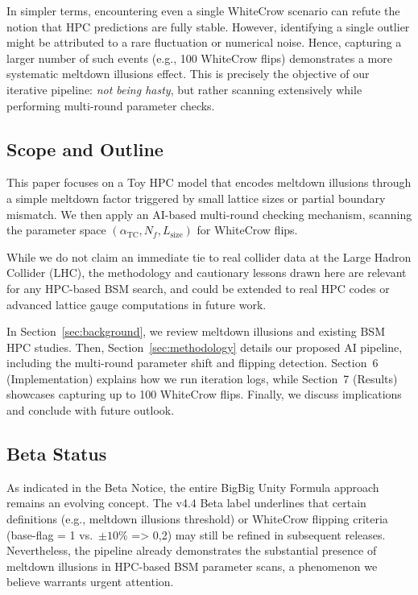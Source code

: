\documentclass[11pt]{article}
\begin{document}
In simpler terms, encountering even a single WhiteCrow scenario can refute 
the notion that HPC predictions are fully stable. However, identifying 
a single outlier might be attributed to a rare fluctuation or numerical noise. 
Hence, capturing a larger number of such events (e.g., 100 WhiteCrow flips) 
demonstrates a more systematic meltdown illusions effect. 
This is precisely the objective of our iterative pipeline: 
\textit{not being hasty}, but rather scanning extensively while performing 
multi-round parameter checks.

\subsection{Scope and Outline}
This paper focuses on a Toy HPC model that encodes meltdown illusions 
through a simple meltdown factor triggered by small lattice sizes 
or partial boundary mismatch. We then apply an AI-based multi-round 
checking mechanism, scanning the parameter space $(\alpha_{\mathrm{TC}}, N_f, L_{\mathrm{size}})$ 
for WhiteCrow flips. 

While we do not claim an immediate tie to real collider data at the Large Hadron Collider (LHC), 
the methodology and cautionary lessons drawn here are relevant 
for any HPC-based BSM search, and could be extended to real HPC codes 
or advanced lattice gauge computations in future work.

In Section~\ref{sec:background}, we review meltdown illusions and existing BSM HPC studies. 
Then, Section~\ref{sec:methodology} details our proposed AI pipeline, 
including the multi-round parameter shift and flipping detection. 
Section~6 (Implementation) explains how we run iteration logs, 
while Section~7 (Results) showcases capturing up to 100 WhiteCrow flips. 
Finally, we discuss implications and conclude with future outlook.

\subsection{Beta Status}
As indicated in the Beta Notice, the entire BigBig Unity Formula approach 
remains an evolving concept. The v4.4 Beta label underlines 
that certain definitions (e.g., meltdown illusions threshold) 
or WhiteCrow flipping criteria (base-flag = 1 vs.\ $\pm 10\%$ => 0,2) 
may still be refined in subsequent releases. 
Nevertheless, the pipeline already demonstrates 
the substantial presence of meltdown illusions 
in HPC-based BSM parameter scans, a phenomenon we believe warrants urgent attention.
\end{document}
